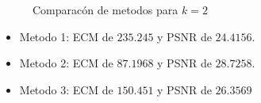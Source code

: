 \begin{figure}[H]
    \centering
    \qquad
    \qquad
    \caption{Comparacón de metodos para $k = 2$}%
    \label{fig:example}%
\end{figure}

\begin{itemize}
 \item Metodo 1: ECM de $235.245$ y PSNR de $24.4156$.
 \item Metodo 2: ECM de $87.1968$ y PSNR de $28.7258$.
 \item Metodo 3: ECM de $150.451$ y PSNR de $26.3569$
\end{itemize}

